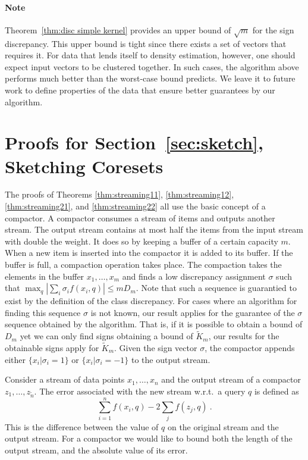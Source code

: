 \documentclass[anon,12pt]{colt2019} %
\begin{document}
{\paragraph{Note} Theorem~\ref{thm:disc simple kernel} provides an upper bound of $\sqrt{m}$ for the sign discrepancy. 
This upper bound is tight since there exists a set of vectors that requires it. 
For data that lends itself to density estimation, however, one should expect input vectors to be clustered together.
In such cases, the algorithm above performs much better than the worst-case bound predicts. We leave it to future work to define properties of the data that ensure better guarantees by our algorithm.


\appendix

\section{Proofs for Section~\ref{sec:sketch}, Sketching Coresets} \label{app:sketch proof}


The proofs of Theorems \ref{thm:streaming11}, \ref{thm:streaming12}, \ref{thm:streaming21}, and \ref{thm:streaming22} all use the basic concept of a compactor. A compactor consumes a stream of items and outputs another stream. 
The output stream contains at most half the items from the input stream with double the weight. 
It does so by keeping a buffer of a certain capacity $m$. When a new item is inserted into the compactor it is added to its buffer. 
If the buffer is full, a compaction operation takes place. 
The compaction takes the elements in the buffer $x_1,\ldots,x_m$ and finds a low discrepancy assignment $\sigma$ such that 
$\max_q |\sum_i \sigma_i f(x_i,q)| \leq m D_m$. 
Note that such a sequence is guarantied to exist by the definition of the class discrepancy. For cases where an algorithm for finding this sequence $\sigma$ is not known, our result applies for the guarantee of the $\sigma$ sequence obtained by the algorithm. That is, if it is possible to obtain a bound of $D_m$ yet we can only find signs obtaining a bound of $\tilde{K}_m$, our results for the obtainable signs apply for $\tilde{K}_m$.
Given the sign vector $\sigma$, the compactor appends either $\{ x_i | \sigma_i = 1\}$ or  $\{ x_i | \sigma_i = -1\}$ to the output stream. 

Consider a stream of data points $x_1,\ldots,x_n$ and the output stream of a compactor $z_1,\ldots,z_{\tilde{n}}$. The error associated with the new stream w.r.t.\ a query $q$ is defined as
$$ \sum_{i=1}^n f(x_i,q) - 2\sum_j f(z_j,q) \ .$$
This is the difference between the value of $q$ on the original stream and the output stream. For a compactor we would like to bound both the length of the output stream, and the absolute value of its error.

}
\end{document}
